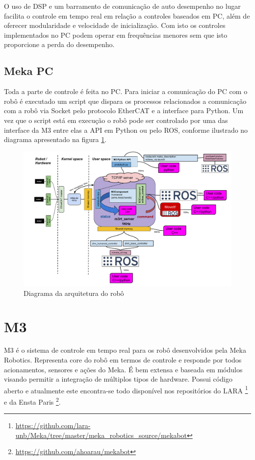 O uso de DSP e um barramento de comunicação de auto desempenho no lugar facilita o controle em tempo real em relação a controles baseados em PC, além de oferecer modularidade e velocidade de inicialização\cite{edsinger2004domo}. Com isto os controles implementados no PC podem operar em frequências menores sem que isto proporcione a perda do desempenho.


\subsection{Meka PC}

Toda a parte de controle é feita no PC. Para iniciar a comunicação do PC com o robô é executado um script que dispara os processos relacionados a comunicação com a robô via Socket pelo protocolo EtherCAT e a interface para Python. Um vez que o script está em execução o robô pode ser controlado por uma das interface da M3 entre elas a API em Python ou pelo ROS, conforme ilustrado no diagrama apresentado na figura \ref{fig:mekaarch}.

\begin{figure}[H]
    \centering
    \includegraphics[width=0.9\linewidth]{figs/m3_arch.pdf}
    \caption{Diagrama da arquitetura do robô \cite{hoarau2015}}
    \label{fig:mekaarch}
\end{figure}

\section{M3}

M3 é o sistema de controle em tempo real para os robô desenvolvidos pela Meka Robotics. Representa core do robô em termos de controle e responde por todos acionamentos, sensores e ações do Meka. É bem extensa e baseada em módulos visando permitir a integração de múltiplos tipos de hardware. Possui código aberto e atualmente este encontra-se todo disponível nos repositórios do LARA \footnote{\url{https://github.com/lara-unb/Meka/tree/master/meka_robotics_source/mekabot}} e da Ensta Paris \footnote{\url{https://github.com/ahoarau/mekabot}}.

